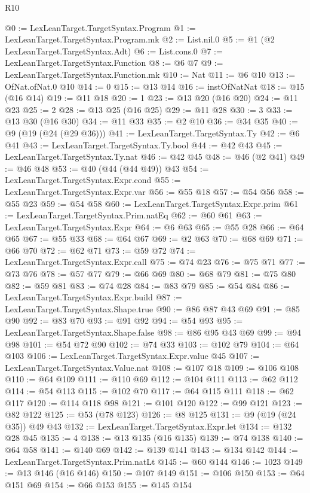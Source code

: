 \begin{lexlean}{R10}
\begin{coremodule}
@0 := LexLeanTarget.TargetSyntax.Program
@1 := LexLeanTarget.TargetSyntax.Program.mk
@2 := List.nil.{0}
@5 := @1 (@2 LexLeanTarget.TargetSyntax.Adt)
@6 := List.cons.{0}
@7 := LexLeanTarget.TargetSyntax.Function
@8 := @6 @7
@9 := LexLeanTarget.TargetSyntax.Function.mk
@10 := Nat
@11 := @6 @10
@13 := OfNat.ofNat.{0} @10
@14 := 0
@15 := @13 @14
@16 := instOfNatNat
@18 := @15 (@16 @14)
@19 := @11 @18
@20 := 1
@23 := @13 @20 (@16 @20)
@24 := @11 @23
@25 := 2
@28 := @13 @25 (@16 @25)
@29 := @11 @28
@30 := 3
@33 := @13 @30 (@16 @30)
@34 := @11 @33
@35 := @2 @10
@36 := @34 @35
@40 := @9 (@19 (@24 (@29 @36)))
@41 := LexLeanTarget.TargetSyntax.Ty
@42 := @6 @41
@43 := LexLeanTarget.TargetSyntax.Ty.bool
@44 := @42 @43
@45 := LexLeanTarget.TargetSyntax.Ty.nat
@46 := @42 @45
@48 := @46 (@2 @41)
@49 := @46 @48
@53 := @40 (@44 (@44 @49)) @43
@54 := LexLeanTarget.TargetSyntax.Expr.cond
@55 := LexLeanTarget.TargetSyntax.Expr.var
@56 := @55 @18
@57 := @54 @56
@58 := @55 @23
@59 := @54 @58
@60 := LexLeanTarget.TargetSyntax.Expr.prim
@61 := LexLeanTarget.TargetSyntax.Prim.natEq
@62 := @60 @61
@63 := LexLeanTarget.TargetSyntax.Expr
@64 := @6 @63
@65 := @55 @28
@66 := @64 @65
@67 := @55 @33
@68 := @64 @67
@69 := @2 @63
@70 := @68 @69
@71 := @66 @70
@72 := @62 @71
@73 := @59 @72
@74 := LexLeanTarget.TargetSyntax.Expr.call
@75 := @74 @23
@76 := @75 @71
@77 := @73 @76
@78 := @57 @77
@79 := @66 @69
@80 := @68 @79
@81 := @75 @80
@82 := @59 @81
@83 := @74 @28
@84 := @83 @79
@85 := @54 @84
@86 := LexLeanTarget.TargetSyntax.Expr.build
@87 := LexLeanTarget.TargetSyntax.Shape.true
@90 := @86 @87 @43 @69
@91 := @85 @90
@92 := @83 @70
@93 := @91 @92
@94 := @54 @93
@95 := LexLeanTarget.TargetSyntax.Shape.false
@98 := @86 @95 @43 @69
@99 := @94 @98
@101 := @54 @72 @90
@102 := @74 @33
@103 := @102 @79
@104 := @64 @103
@106 := LexLeanTarget.TargetSyntax.Expr.value @45
@107 := LexLeanTarget.TargetSyntax.Value.nat
@108 := @107 @18
@109 := @106 @108
@110 := @64 @109
@111 := @110 @69
@112 := @104 @111
@113 := @62 @112
@114 := @54 @113
@115 := @102 @70
@117 := @64 @115 @111
@118 := @62 @117
@120 := @114 @118 @98
@121 := @101 @120
@122 := @99 @121
@123 := @82 @122
@125 := @53 (@78 @123)
@126 := @8 @125
@131 := @9 (@19 (@24 @35)) @49 @43
@132 := LexLeanTarget.TargetSyntax.Expr.let
@134 := @132 @28 @45
@135 := 4
@138 := @13 @135 (@16 @135)
@139 := @74 @138
@140 := @64 @58
@141 := @140 @69
@142 := @139 @141
@143 := @134 @142
@144 := LexLeanTarget.TargetSyntax.Prim.natLt
@145 := @60 @144
@146 := 1023
@149 := @13 @146 (@16 @146)
@150 := @107 @149
@151 := @106 @150
@153 := @64 @151 @69
@154 := @66 @153
@155 := @145 @154

\end{coremodule}
\end{lexlean}
